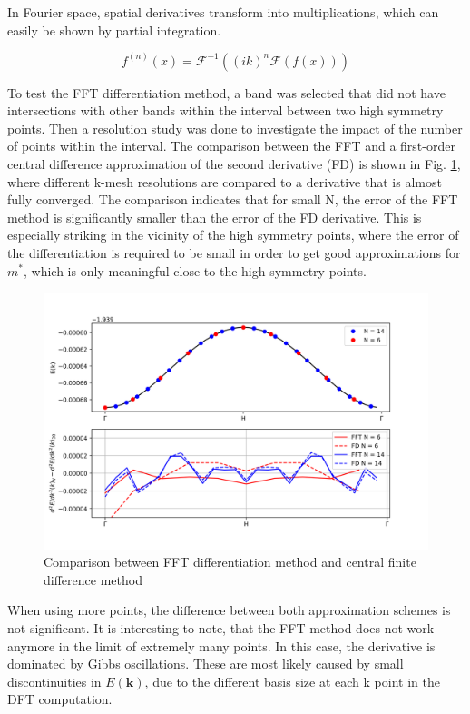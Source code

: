 In Fourier space, spatial derivatives transform into multiplications, which can easily be shown by partial integration.

\begin{equation}
    f^{(n)}(x) = \mathcal{F}^{-1}\left((ik)^n\mathcal{F}(f(x))\right)
\end{equation}
 
To test the FFT differentiation method, a band was selected that did not have intersections with other bands within the interval between two high symmetry points. Then a resolution study was done to investigate the impact of the number of points within the interval.
The comparison between the FFT and a first-order central difference approximation of the second derivative (FD) is shown in Fig. \ref{num_diff}, where different k-mesh resolutions are compared to a derivative that is almost fully converged. The comparison indicates that for small N, the error of the FFT method is significantly smaller than the error of the FD derivative. This is especially striking in the vicinity of the high symmetry points, where the error of the differentiation is required to be small in order to get good approximations for $m^{*}$, which is only meaningful close to the high symmetry points.


\begin{figure}[htb!]
    \centering
    \includegraphics[width=0.7\linewidth]{christian/diff_compare.png}
    \caption{Comparison between FFT differentiation method and central finite difference method}
    \label{num_diff}
\end{figure}

When using more points, the difference between both approximation schemes is not significant. It is interesting to note, that the FFT method does not work anymore in the limit of extremely many points. In this case, the derivative is dominated by Gibbs oscillations. These are most likely caused by small discontinuities in $E(\mathbf{k})$, due to the different basis size at each k point in the DFT computation.

